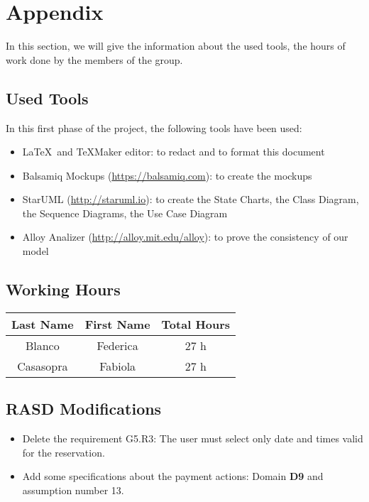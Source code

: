 \section{Appendix} \label{sec:appendix}

In this section, we will give the information about the used tools, the hours of work done by the members of the group.

\subsection{Used Tools} \label{tools}

In this first phase of the project, the following tools have been used:

\begin{itemize}
	\item \LaTeX\ and TeXMaker editor: to redact and to format this document
	\item Balsamiq Mockups (\url{https://balsamiq.com}): to create the mockups
	\item StarUML (\url{http://staruml.io}): to create the State Charts, the Class Diagram, the Sequence Diagrams, the Use Case Diagram 
	\item Alloy Analizer (\url{http://alloy.mit.edu/alloy}): to prove the consistency of our model
\end{itemize}

\subsection{Working Hours} \label{worked}

\begin{table}[htbp]
\begin{center}
\begin{tabular}[t]{ccc}

\hline
\textbf{Last Name} & \textbf{First Name} & \textbf{Total Hours} \\
\hline
Blanco & Federica &  27 h\\
\hline
Casasopra & Fabiola &  27 h\\
\hline

\end{tabular}
\end{center}
\end{table}

\subsection{RASD Modifications} \label{modify}
\begin{itemize}
\item Delete the requirement G5.R3: The user must select only date and times valid for the reservation.
\item Add some specifications about the payment actions: Domain \textbf{D9} and assumption number 13.
\end{itemize}